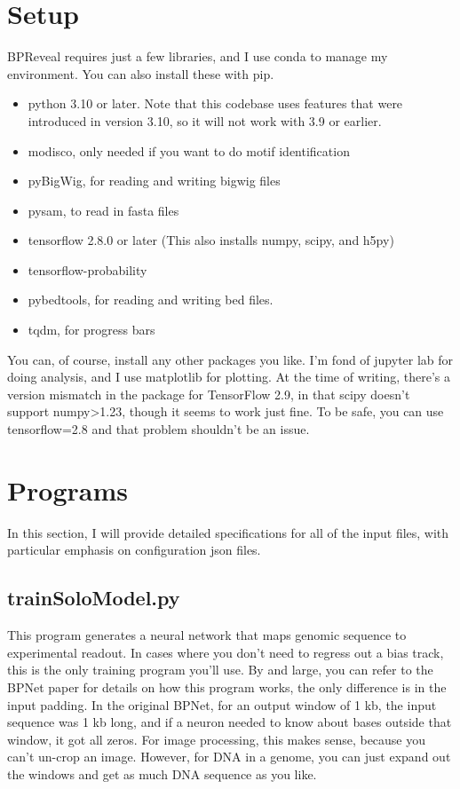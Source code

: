 \documentclass{article}
\begin{document}
\section{Setup}
BPReveal requires just a few libraries, and I use conda to manage my environment. You can also install these with pip. 
\begin{itemize}
    \item python 3.10 or later. Note that this codebase uses features that were introduced in version 3.10, so it will not work with 3.9 or earlier. 
    \item modisco, only needed if you want to do motif identification
    \item pyBigWig, for reading and writing bigwig files
    \item pysam, to read in fasta files
    \item tensorflow 2.8.0 or later (This also installs numpy, scipy, and h5py)
    \item tensorflow-probability
    \item pybedtools, for reading and writing bed files.
    \item tqdm, for progress bars
\end{itemize}

You can, of course, install any other packages you like. 
I'm fond of jupyter lab for doing analysis, and I use matplotlib for plotting. 
At the time of writing, there's a version mismatch in the package for TensorFlow 2.9, in that scipy doesn't support numpy>1.23, though it seems to work just fine. To be safe, you can use tensorflow=2.8 and that problem shouldn't be an issue. 




\section{Programs}
In this section, I will provide detailed specifications for all of the input files, with particular emphasis on configuration json files.

\subsection{trainSoloModel.py}
This program generates a neural network that maps genomic sequence to experimental readout. 
In cases where you don't need to regress out a bias track, this is the only training program you'll use. 
By and large, you can refer to the BPNet paper for details on how this program works, the only difference is in the input padding. 
In the original BPNet, for an output window of 1 kb, the input sequence was 1 kb long, and if a neuron needed to know about bases outside that window, it got all zeros. 
For image processing, this makes sense, because you can't un-crop an image. However, for DNA in a genome, you can just expand out the windows and get as much DNA sequence as you like.
\end{document}
